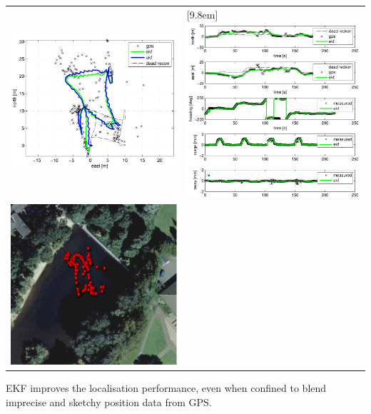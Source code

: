 \documentclass[portrait,final,a0paper]{baposter}
\begin{document}
\begin{poster}
{\begin{tabular}{cl}
\hspace{-1.0em} \includegraphics[width=0.4\linewidth]{square.pdf}             & \hspace{-1.0em} \multirow{2}{*}[9.8em]{\includegraphics[width=0.56\linewidth]{square-filtering.pdf}} \\
\hspace{-1.0em} \includegraphics[width=0.23\linewidth]{square-trajectory.pdf} &  \hspace{-1.0em}   \\
\end{tabular}
EKF improves the localisation performance, even when confined to blend imprecise and sketchy position data from GPS.
  \vspace{0.3em}
  }


\end{poster}
\end{document}
